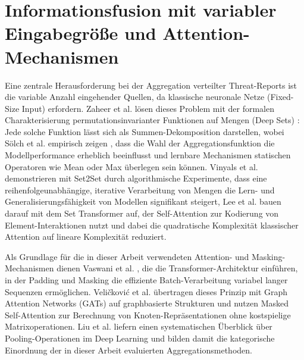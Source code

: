 \section{Informationsfusion mit variabler Eingabegröße und Attention-Mechanismen}
Eine zentrale Herausforderung bei der Aggregation verteilter Threat-Reports ist die variable Anzahl eingehender Quellen, da klassische neuronale Netze (Fixed-Size Input) erfordern. Zaheer et al. lösen dieses Problem mit der formalen Charakterisierung permutationsinvarianter Funktionen auf Mengen (Deep Sets) \cite{zaheer2017deepsets}: Jede solche Funktion lässt sich als Summen-Dekomposition darstellen, wobei Sölch et al. empirisch zeigen \cite{soelch2019deepsetAgg}, dass die Wahl der Aggregationsfunktion die Modellperformance erheblich beeinflusst und lernbare Mechanismen statischen Operatoren wie Mean oder Max überlegen sein können. Vinyals et al. demonstrieren mit Set2Set \cite{vinyals2016orderm} durch algorithmische Experimente, dass eine reihenfolgeunabhängige, iterative Verarbeitung von Mengen die Lern- und Generalisierungsfähigkeit von Modellen signifikant steigert, Lee et al. bauen darauf mit dem Set Transformer \cite{lee2019settransformer} auf, der Self-Attention zur Kodierung von Element-Interaktionen nutzt und dabei die quadratische Komplexität klassischer Attention auf lineare Komplexität reduziert.

Als Grundlage für die in dieser Arbeit verwendeten Attention- und Masking-Mechanismen dienen Vaswani et al. \cite{vaswani2017attention}, die die Transformer-Architektur einführen, in der Padding und Masking die effiziente Batch-Verarbeitung variabel langer Sequenzen ermöglichen. Veličković et al. übertragen dieses Prinzip mit Graph Attention Networks (GATs) \cite{velickovic2018gat} auf graphbasierte Strukturen und nutzen Masked Self-Attention zur Berechnung von Knoten-Repräsentationen ohne kostspielige Matrixoperationen. Liu et al. \cite{liu2022pooling} liefern einen systematischen Überblick über Pooling-Operationen im Deep Learning und bilden damit die kategorische Einordnung der in dieser Arbeit evaluierten Aggregationsmethoden.

